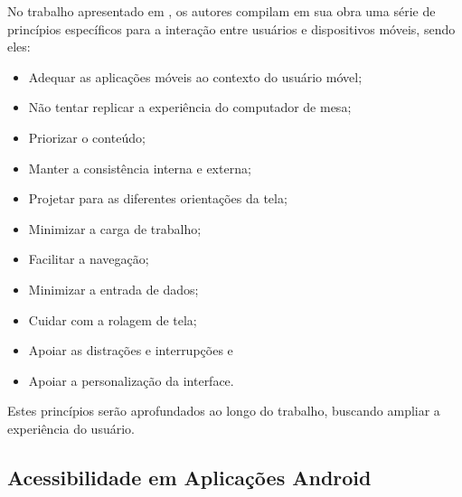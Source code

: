 No trabalho apresentado em \cite{ERGO2015}, os autores compilam em sua obra uma série de princípios específicos para a interação entre usuários e dispositivos móveis, sendo eles:
\begin{itemize}
	\item Adequar as aplicações móveis ao contexto do usuário móvel;
	\item Não tentar replicar a experiência do computador de mesa;
	\item Priorizar o conteúdo;
	\item Manter a consistência interna e externa;
	\item Projetar para as diferentes orientações da tela;
	\item Minimizar a carga de trabalho;
	\item Facilitar a navegação;
	\item Minimizar a entrada de dados;
	\item Cuidar com a rolagem de tela;
	\item Apoiar as distrações e interrupções e
	\item Apoiar a personalização da interface.
\end{itemize}
Estes princípios serão aprofundados ao longo do trabalho, buscando ampliar a experiência do usuário.


\subsection{Acessibilidade em Aplicações Android}

